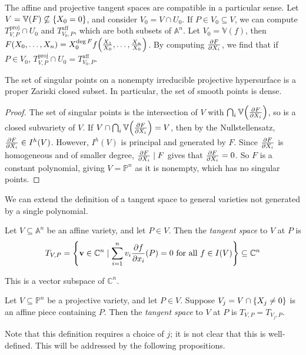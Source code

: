The affine and projective tangent spaces are compatible in a particular sense.
Let \( V = \mathbb V(F) \not\subseteq \qty{X_0 = 0} \), and consider \( V_0 = V \cap U_0 \).
If \( P \in V_0 \subseteq V \), we can compute \( T_{V,P}^{\mathrm{proj}} \cap U_0 \) and \( T_{V_0,P}^{\mathrm{aff}} \), which are both subsets of \( \mathbb A^n \).
Let \( V_0 = \mathbb V(f) \), then \( F(X_0, \dots, X_n) = X_0^{\deg F} f\qty(\frac{X_1}{X_0}, \dots, \frac{X_n}{X_0}) \).
By computing \( \pdv{F}{X_i} \), we find that if \( P \in V_0 \), \( T_{V,P}^{\mathrm{proj}} \cap U_0 = T_{V_0,P}^{\mathrm{aff}} \).
\begin{proposition}
    The set of singular points on a nonempty irreducible projective hypersurface is a proper Zariski closed subset.
    In particular, the set of smooth points is dense.
\end{proposition}
\begin{proof}
    The set of singular points is the intersection of \( V \) with \( \bigcap_i \mathbb V\qty(\pdv{F}{X_i}) \), so is a closed subvariety of \( V \).
    If \( V \cap \bigcap_i \mathbb V\qty(\pdv{F}{X_i}) = V \), then by the Nullstellensatz, \( \pdv{F}{X_i} \in I^h(V) \).
    However, \( I^h(V) \) is principal and generated by \( F \).
    Since \( \pdv{F}{X_i} \) is homogeneous and of smaller degree, \( \pdv{F}{X_i} \mid F \) gives that \( \pdv{F}{X_i} = 0 \).
    So \( F \) is a constant polynomial, giving \( V = \mathbb P^n \) as it is nonempty, which has no singular points.
\end{proof}
We can extend the definition of a tangent space to general varieties not generated by a single polynomial.
\begin{definition}
    Let \( V \subseteq \mathbb A^n \) be an affine variety, and let \( P \in V \).
    Then the \emph{tangent space} to \( V \) at \( P \) is
    \[ T_{V,P} = \qty{\vb v \in \mathbb C^n \mid \sum_{i=1}^n v_i \pdv{f}{x_i}\qty(P) = 0 \text{ for all } f \in I(V)} \subseteq \mathbb C^n \]
\end{definition}
This is a vector subspace of \( \mathbb C^n \).
\begin{definition}
    Let \( V \subseteq \mathbb P^n \) be a projective variety, and let \( P \in V \).
    Suppose \( V_j = V \cap \qty{X_j \neq 0} \) is an affine piece containing \( P \).
    Then the \emph{tangent space} to \( V \) at \( P \) is \( T_{V,P} = T_{V_j,P} \).
\end{definition}
Note that this definition requires a choice of \( j \); it is not clear that this is well-defined.
This will be addressed by the following propositions.

